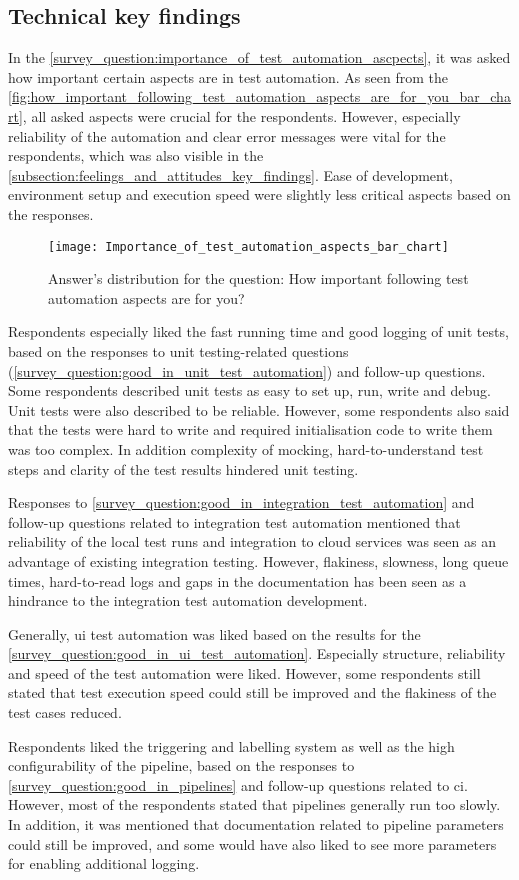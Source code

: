 \subsection{Technical key findings}\label{subsection:technical_key_findings}
In the \autoref{survey_question:importance_of_test_automation_ascpects}, it was asked how important certain aspects are in test automation. As seen from the \autoref{fig:how_important_following_test_automation_aspects_are_for_you_bar_chart}, all asked aspects were crucial for the respondents. However, especially reliability of the automation and clear error messages were vital for the respondents, which was also visible in the \autoref{subsection:feelings_and_attitudes_key_findings}. Ease of development, environment setup and execution speed were slightly less critical aspects based on the responses.

\begin{figure}
	\centering
	\texttt{[image: Importance\_of\_test\_automation\_aspects\_bar\_chart]}
	\caption{Answer's distribution for the question: How important following test automation aspects are for you?}
	\label{fig:how_important_following_test_automation_aspects_are_for_you_bar_chart}
\end{figure}

Respondents especially liked the fast running time and good logging of unit tests, based on the responses to unit testing-related questions (\autoref{survey_question:good_in_unit_test_automation}) and follow-up questions. Some respondents described unit tests as easy to set up, run, write and debug. Unit tests were also described to be reliable. However, some respondents also said that the tests were hard to write and required initialisation code to write them was too complex. In addition complexity of mocking, hard-to-understand test steps and clarity of the test results hindered unit testing.

Responses to \autoref{survey_question:good_in_integration_test_automation} and follow-up questions related to integration test automation mentioned that reliability of the local test runs and integration to cloud services was seen as an advantage of existing integration testing. However, flakiness, slowness, long queue times, hard-to-read logs and gaps in the documentation has been seen as a hindrance to the integration test automation development.

Generally, \gls{ui} test automation was liked based on the results for the \autoref{survey_question:good_in_ui_test_automation}. Especially structure, reliability and speed of the test automation were liked. However, some respondents still stated that test execution speed could still be improved and the flakiness of the test cases reduced.

Respondents liked the triggering and labelling system as well as the high configurability of the pipeline, based on the responses to \autoref{survey_question:good_in_pipelines} and follow-up questions related to \gls{ci}. However, most of the respondents stated that pipelines generally run too slowly. In addition, it was mentioned that documentation related to pipeline parameters could still be improved, and some would have also liked to see more parameters for enabling additional logging.